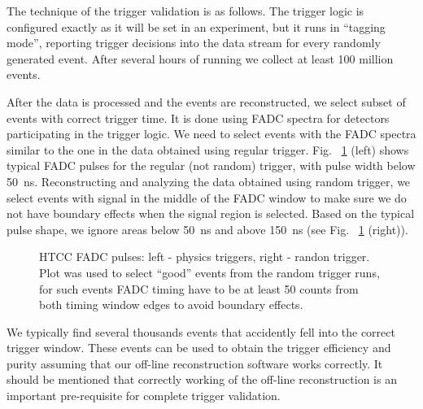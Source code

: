 The technique of the trigger validation is as follows. The trigger logic is configured exactly as it will be set in an experiment, but it runs in ``tagging mode'', reporting trigger decisions into the data stream for every randomly generated event. After several hours of running we collect at least 100 million events.

After the data is processed and the events are reconstructed, we select subset of events with correct trigger time. It is done using FADC spectra for detectors participating in the trigger logic. We need to select events with the FADC spectra similar to the one in the data obtained using regular trigger. Fig. ~\ref{fig:htcc_fadc} (left) shows typical FADC pulses for the regular (not random) trigger, with pulse width below 50~ns. Reconstructing and analyzing the data obtained using random trigger, we select events with signal in the middle of the FADC window to make sure we do not have boundary effects when the signal region is selected. Based on the typical pulse shape, we ignore areas below 50~ns and above 150~ns (see Fig. ~\ref{fig:htcc_fadc} (right)).

\begin{figure}[!htb]
	\centering
	\caption{HTCC FADC pulses: left - physics triggers, right - randon trigger. Plot was used to select ``good'' events from the random trigger runs, for such events FADC timing have to be at least 50 counts from both timing window edges to avoid boundary effects.}
	\label{fig:htcc_fadc}
\end{figure}

We typically find several thousands events that accidently fell into the correct trigger window. These events can be used to obtain the trigger efficiency and purity assuming that our off-line reconstruction software works correctly. It should be mentioned that correctly working of the off-line reconstruction is an important pre-requisite for complete trigger validation.


